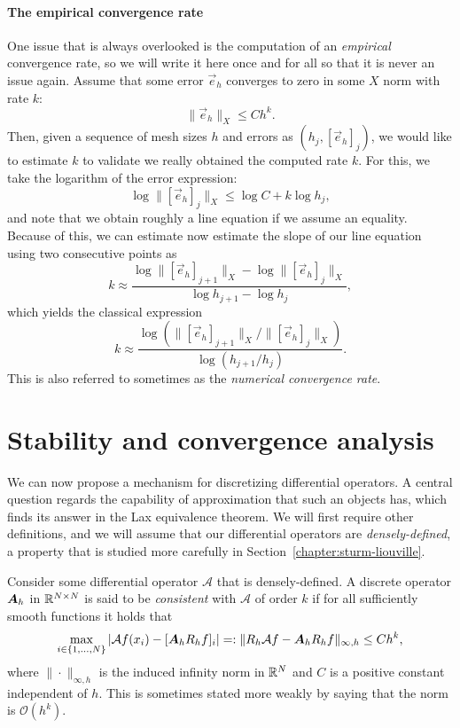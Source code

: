 \paragraph{The empirical convergence rate} One issue that is always overlooked is the computation of an \emph{empirical} convergence rate, so we will write it here once and for all so that it is never an issue again. Assume that some error $\vec e_h$ converges to zero in some $X$ norm with rate $k$:
\begin{equation*}
    \|\vec e_h\|_X \leq C h^k.
\end{equation*}
Then, given a sequence of mesh sizes $h$ and errors as $(h_j, [\vec e_h]_j)$, we would like to estimate $k$ to validate we really obtained the computed rate $k$. For this, we take the logarithm of the error expression:
\begin{equation*}
    \log \|[\vec e_h]_j\|_X \leq \log C + k \log h_j,
\end{equation*}
and note that we obtain roughly a line equation if we assume an equality. Because of this, we can estimate now estimate the slope of our line equation using two consecutive points as
\begin{equation*}
    k \approx \frac{\log \|[\vec e_h]_{j+1}\|_X - \log \|[\vec e_h]_j\|_X}{ \log h_{j+1} - \log h_j},
\end{equation*}
which yields the classical expression
\begin{equation}
    k \approx  \frac{\log \left(\|[\vec e_h]_{j+1}\|_X / \|[\vec e_h]_j\|_X\right)}{ \log \left(h_{j+1} / h_j\right)}.
\end{equation}
This is also referred to sometimes as the \emph{numerical convergence rate}. 

\section{Stability and convergence analysis}\label{sec:fd-convergence-analysis}
We can now propose a mechanism for discretizing differential operators. A central question regards the capability of approximation that such an objects has, which finds its answer in the Lax equivalence theorem. We will first require other definitions, and we will assume that our differential operators are \emph{densely-defined}, a property that is studied more carefully in Section~\ref{chapter:sturm-liouville}.

\begin{definition}[Consistency]
    Consider some differential operator $\mathcal A$ that is densely-defined. A discrete operator $\mat A_h$ in $\mathbb{R}^{N\times N}$ is said to be \emph{consistent} with $\mathcal A$ of order $k$ if for all sufficiently smooth functions it holds that
    \begin{equation}\label{def:consistency}
        \max_{i\in\{1,\hdots,N\}}|\mathcal Af(x_i) - [\mat A_h R_h f]_i| =: \|R_h \mathcal Af - \mat A_hR_h f\|_{\infty,h} \leq C h^k,
    \end{equation}
    where $\|\cdot \|_{\infty,h}$ is the induced infinity norm in $\mathbb{R}^N$ and $C$ is a positive constant independent of $h$. This is sometimes stated more weakly by saying that the norm is $\mathcal O(h^k)$. 
\end{definition}

